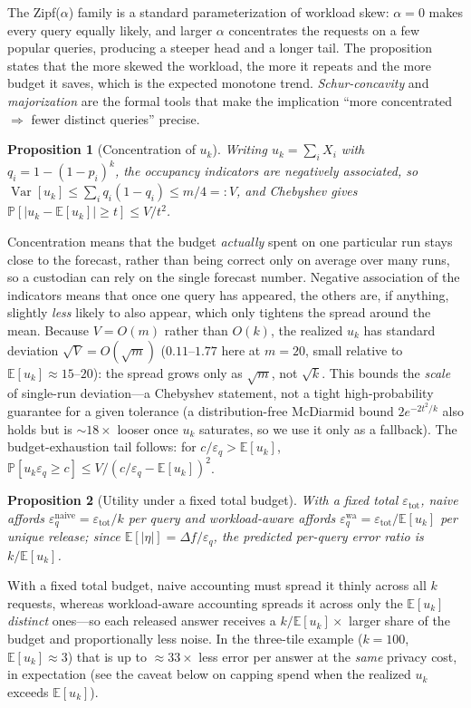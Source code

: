 \documentclass[sigconf,nonacm]{acmart}
\newcommand{\eps}{\varepsilon}
\newcommand{\E}{\mathbb{E}}
\newcommand{\Prob}{\mathbb{P}}
\DeclareMathOperator{\Var}{Var}
\newtheorem{prop}{Proposition}
\begin{document}
\noindent The Zipf($\alpha$) family is a standard parameterization of workload skew: $\alpha{=}0$ makes every query equally likely, and larger $\alpha$ concentrates the requests on a few popular queries, producing a steeper head and a longer tail. The proposition states that the more skewed the workload, the more it repeats and the more budget it saves, which is the expected monotone trend. \emph{Schur-concavity} and \emph{majorization} are the formal tools that make the implication ``more concentrated $\Rightarrow$ fewer distinct queries'' precise.

\begin{prop}[Concentration of $u_k$]
\label{prop:conc}
Writing $u_k=\sum_iX_i$ with $q_i=1-(1-p_i)^k$, the occupancy indicators are negatively associated, so
$\Var[u_k]\le\sum_i q_i(1-q_i)\le m/4=:V$, and Chebyshev gives $\Prob[|u_k-\E[u_k]|\ge t]\le V/t^2$.
\end{prop}

\noindent Concentration means that the budget \emph{actually} spent on one particular run stays close to the forecast, rather than being correct only on average over many runs, so a custodian can rely on the single forecast number. Negative association of the indicators means that once one query has appeared, the others are, if anything, slightly \emph{less} likely to also appear, which only tightens the spread around the mean. Because $V=O(m)$ rather than $O(k)$, the realized $u_k$ has standard deviation $\sqrt V=O(\sqrt m)$ ($0.11$--$1.77$ here at $m{=}20$, small relative to $\E[u_k]\approx15$--$20$): the spread grows only as $\sqrt m$, not $\sqrt k$. This bounds the \emph{scale} of single-run deviation---a Chebyshev statement, not a tight high-probability guarantee for a given tolerance (a distribution-free McDiarmid bound $2e^{-2t^2/k}$ also holds but is $\sim18\times$ looser once $u_k$ saturates, so we use it only as a fallback). The budget-exhaustion tail follows: for $c/\eps_q>\E[u_k]$, $\Prob[u_k\eps_q\ge c]\le V/(c/\eps_q-\E[u_k])^2$.

\begin{prop}[Utility under a fixed total budget]
\label{prop:util}
With a fixed total $\eps_{\mathrm{tot}}$, naive affords $\eps_q^{\mathrm{naive}}=\eps_{\mathrm{tot}}/k$ per query and workload-aware affords $\eps_q^{\mathrm{wa}}=\eps_{\mathrm{tot}}/\E[u_k]$ per unique release; since $\E[|\eta|]=\Delta f/\eps_q$, the predicted per-query error ratio is $k/\E[u_k]$.
\end{prop}

\noindent With a fixed total budget, naive accounting must spread it thinly across all $k$ requests, whereas workload-aware accounting spreads it across only the $\E[u_k]$ \emph{distinct} ones---so each released answer receives a $k/\E[u_k]\times$ larger share of the budget and proportionally less noise. In the three-tile example ($k{=}100$, $\E[u_k]{\approx}3$) that is up to ${\approx}33\times$ less error per answer at the \emph{same} privacy cost, in expectation (see the caveat below on capping spend when the realized $u_k$ exceeds $\E[u_k]$).
\end{document}
